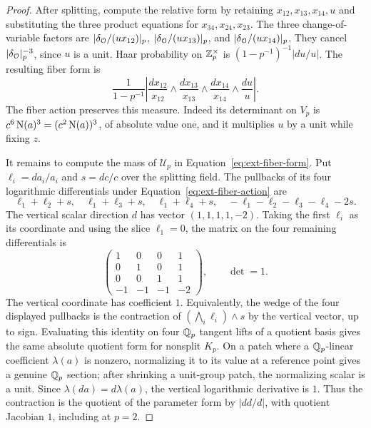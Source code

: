 \begin{proof}
After splitting, compute the relative form by retaining
\(x_{12},x_{13},x_{14},u\) and substituting the three product equations
for \(x_{34},x_{24},x_{23}\).  The three change-of-variable factors are
\(|\delta_{\mathcal O}/(u x_{12})|_p\),
\(|\delta_{\mathcal O}/(u x_{13})|_p\), and
\(|\delta_{\mathcal O}/(u x_{14})|_p\).  They cancel
\(|\delta_{\mathcal O}|_p^{-3}\), since \(u\) is a unit.  Haar probability on
\(\mathbb Z_p^\times\) is \((1-p^{-1})^{-1}|du/u|\).  The resulting fiber form is
\begin{equation}
 \frac{1}{1-p^{-1}}
 \left|\frac{dx_{12}}{x_{12}}\wedge
       \frac{dx_{13}}{x_{13}}\wedge
       \frac{dx_{14}}{x_{14}}\wedge\frac{du}{u}\right|.
 \label{eq:ext-fiber-form}
\end{equation}
The fiber action preserves this measure.  Indeed its determinant on
\(V_p\) is \(c^6\operatorname{N}(a)^3=(c^2\operatorname{N}(a))^3\), of absolute value one,
and it multiplies \(u\) by a unit while fixing \(z\).

It remains to compute the mass of \(\mathscr U_p\) in
Equation~\eqref{eq:ext-fiber-form}.  Put
\(\ell_i=da_i/a_i\) and \(s=dc/c\) over the splitting field.  The
pullbacks of its four logarithmic differentials under
Equation~\eqref{eq:ext-fiber-action} are
\[
 \ell_1+\ell_2+s,\quad \ell_1+\ell_3+s,\quad
 \ell_1+\ell_4+s,\quad -\ell_1-\ell_2-\ell_3-\ell_4-2s.
\]
The vertical scalar direction \(d\) has vector
\((1,1,1,1,-2)\).  Taking the first \(\ell_i\) as its coordinate and
using the slice \(\ell_1=0\), the matrix on the four remaining
differentials is
\[
 \begin{pmatrix}
  1&0&0&1\\
  0&1&0&1\\
  0&0&1&1\\
  -1&-1&-1&-2
 \end{pmatrix},
 \qquad \det=1.
\]
The vertical coordinate has coefficient \(1\).  Equivalently, the
wedge of the four displayed pullbacks is the contraction of
\((\bigwedge_i\ell_i)\wedge s\) by the vertical vector, up to sign.
Evaluating this identity on four \(\mathbb Q_p\) tangent lifts of a quotient basis
gives the same absolute quotient form for nonsplit \(K_p\).  On a patch
where a \(\mathbb Q_p\)-linear coefficient \(\lambda(a)\) is nonzero, normalizing
it to its value at a reference point gives a genuine \(\mathbb Q_p\) section;
after shrinking a unit-group patch, the normalizing scalar is a unit.
Since \(\lambda(da)=d\lambda(a)\), the vertical logarithmic derivative is
\(1\).  Thus the contraction is the quotient of the parameter form by
\(|dd/d|\), with quotient Jacobian \(1\), including at \(p=2\).


\end{proof}
